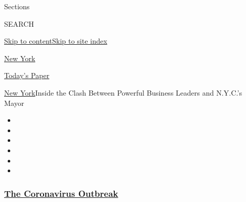 Sections

SEARCH

\protect\hyperlink{site-content}{Skip to
content}\protect\hyperlink{site-index}{Skip to site index}

\href{https://www.nytimes3xbfgragh.onion/section/nyregion}{New York}

\href{https://myaccount.nytimes3xbfgragh.onion/auth/login?response_type=cookie\&client_id=vi}{}

\href{https://www.nytimes3xbfgragh.onion/section/todayspaper}{Today's
Paper}

\href{/section/nyregion}{New York}\textbar{}Inside the Clash Between
Powerful Business Leaders and N.Y.C.'s Mayor

\begin{itemize}
\item
\item
\item
\item
\item
\item
\end{itemize}

\hypertarget{the-coronavirus-outbreak}{%
\subsubsection{\texorpdfstring{\href{https://www.nytimes3xbfgragh.onion/news-event/coronavirus?name=styln-coronavirus-national\&region=TOP_BANNER\&block=storyline_menu_recirc\&action=click\&pgtype=Article\&impression_id=49c370a0-f52d-11ea-bb3a-a9cd15cea7c9\&variant=undefined}{The
Coronavirus
Outbreak}}{The Coronavirus Outbreak}}\label{the-coronavirus-outbreak}}

